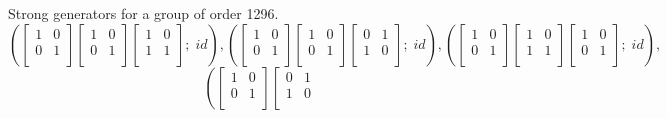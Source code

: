 {\small\arraycolsep=2pt
Strong generators for a group of order 1296.
$$
\left(\left[
\begin{array}{*{2}{r}}
1 & 0\\
0 & 1\\
\end{array}
\right]
\left[
\begin{array}{*{2}{r}}
1 & 0\\
0 & 1\\
\end{array}
\right]
\left[
\begin{array}{*{2}{r}}
1 & 0\\
1 & 1\\
\end{array}
\right]
; \;
id\right)
, 
\left(\left[
\begin{array}{*{2}{r}}
1 & 0\\
0 & 1\\
\end{array}
\right]
\left[
\begin{array}{*{2}{r}}
1 & 0\\
0 & 1\\
\end{array}
\right]
\left[
\begin{array}{*{2}{r}}
0 & 1\\
1 & 0\\
\end{array}
\right]
; \;
id\right)
, 
\left(\left[
\begin{array}{*{2}{r}}
1 & 0\\
0 & 1\\
\end{array}
\right]
\left[
\begin{array}{*{2}{r}}
1 & 0\\
1 & 1\\
\end{array}
\right]
\left[
\begin{array}{*{2}{r}}
1 & 0\\
0 & 1\\
\end{array}
\right]
; \;
id\right)
, 
$$
$$
\left(\left[
\begin{array}{*{2}{r}}
1 & 0\\
0 & 1\\
\end{array}
\right]
\left[
\begin{array}{*{2}{r}}
0 & 1\\
1 & 0\\
\end{array}
$$}

